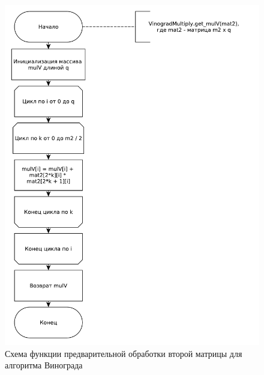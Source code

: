 \documentclass[12pt]{report}
\begin{document}
    \begin{figure}[H]
        \centering
        \includegraphics[width=0.85\linewidth]{img/vinograd_get_mulv}
        \caption{
                Схема функции предварительной обработки второй матрицы для алгоритма Винограда
            }
        \label{fig:vin_mulv}
    \end{figure}
\end{document}

